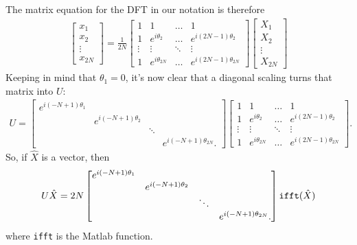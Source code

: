 The matrix equation for the DFT in our notation is therefore
\begin{align*}
 \begin{bmatrix}
  x_1 \\ x_2 \\ \vdots \\ x_{2N}
 \end{bmatrix}
 =
 \frac{1}{2N} 
 \begin{bmatrix}
  1       & 1                & \hdots & 1 \\ 
  1       & e^{i\theta_2}    & \hdots & e^{i(2N-1)\theta_2} \\ 
   \vdots & \vdots           & \ddots &  \vdots \\ 
  1       & e^{i\theta_{2N}} & \hdots & e^{i(2N-1)\theta_{2N}}
 \end{bmatrix}
 \begin{bmatrix}
  X_1 \\ X_2 \\ \vdots \\ X_{2N}
 \end{bmatrix}
\end{align*}
Keeping in mind that $\theta_1 = 0$, it's now clear that 
a diagonal scaling turns that matrix into $U$:
\begin{align*}
 U =
 \begin{bmatrix}
  e^{i(-N+1)\theta_1} &                     &        & \\ 
                      & e^{i(-N+1)\theta_2} &        & \\ 
                      &                     & \ddots & \\ 
                      &                     &        & e^{i(-N+1)\theta_{2N}}.
 \end{bmatrix}
 \begin{bmatrix}
  1       & 1                & \hdots & 1 \\ 
  1       & e^{i\theta_2}    & \hdots & e^{i(2N-1)\theta_2} \\ 
   \vdots & \vdots           & \ddots &  \vdots \\ 
  1       & e^{i\theta_{2N}} & \hdots & e^{i(2N-1)\theta_{2N}}
 \end{bmatrix}.
\end{align*}
So, if $\hat{X}$ is a vector, then
\begin{align*}
 U\hat{X} 
 = 2N
  \begin{bmatrix}
  e^{i(-N+1)\theta_1} &                     &        & \\ 
                      & e^{i(-N+1)\theta_2} &        & \\ 
                      &                     & \ddots & \\ 
                      &                     &        & e^{i(-N+1)\theta_{2N}}.
 \end{bmatrix}
 {\tt ifft}(\hat{X})
\end{align*}
where {\tt ifft} is the Matlab function.


